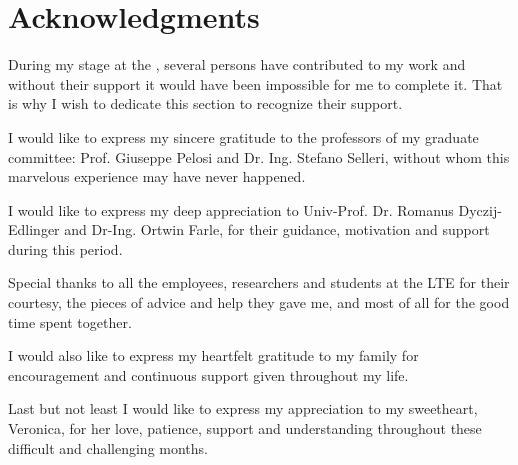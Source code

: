 \cleardoublepage
{}
{}
\chapter*{Acknowledgments}

\par During my stage at the , several persons have contributed to my work and without their support it would have been impossible for me to complete it. That is why I wish to dedicate this section to recognize their support.

\par I would like to express my sincere gratitude to the professors of my graduate committee: Prof. Giuseppe Pelosi and Dr. Ing. Stefano Selleri, without whom this marvelous experience may have never happened.

\par I would like to express my deep appreciation to Univ-Prof. Dr. Romanus Dyczij-Edlinger and Dr-Ing. Ortwin Farle, for their guidance, motivation and support during this period.

\par Special thanks to all the employees, researchers and students at the LTE for their courtesy, the pieces of advice and help they gave me, and most of all for the good time spent together.

\par I would also like to express my heartfelt gratitude to my family for encouragement and continuous support given throughout my life.

\par Last but not least I would like to express my appreciation to my sweetheart, Veronica, for her love, patience, support and understanding throughout these difficult and challenging months.

